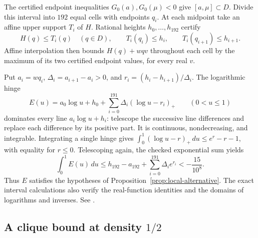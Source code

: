 The certified endpoint inequalities $G_0(a),G_0(\mu)<0$ give
$[a,\mu]\subset D$. Divide this interval into $192$ equal cells
with endpoints $q_i$. At each midpoint take an affine upper support
$T_i$ of $H$. Rational heights $h_0,\ldots,h_{192}$ certify
\[
 H(q)\le T_i(q)\quad(q\in D),\qquad
 T_i(q_i)\le h_i,\qquad T_i(q_{i+1})\le h_{i+1}.
\]
Affine interpolation then bounds $H(q)+wqv$ throughout each cell by
the maximum of its two certified endpoint values, for every real $v$.

Put $a_i=wq_i$, $\Delta_i=a_{i+1}-a_i>0$, and
$r_i=(h_i-h_{i+1})/\Delta_i$. The logarithmic hinge
\[
 E(u)=a_0\log u+h_0+
 \sum_{i=0}^{191}\Delta_i(\log u-r_i)_+
 \qquad(0<u\le1)
\]
dominates every line $a_i\log u+h_i$: telescope the successive line
differences and replace each difference by its positive part.
It is continuous, nondecreasing, and integrable. Integrating a single
hinge gives $\int_0^1(\log u-r)_+\,du\le e^r-r-1$, with equality
for $r\le0$. Telescoping again, the checked exponential sum yields
\begin{equation}\label{eq:certified-integral}
 \int_0^1E(u)\,du
 \le h_{192}-a_{192}+\sum_{i=0}^{191}\Delta_i e^{r_i}
 <-\frac{15}{10^8}.
\end{equation}
Thus $E$ satisfies the hypotheses of Proposition~\ref{prop:local-alternative}.
The exact interval calculations also verify the real-function identities
and the domains of logarithms and inverses. See
.

\subsection{A clique bound at density \texorpdfstring{$1/2$}{1/2}}

